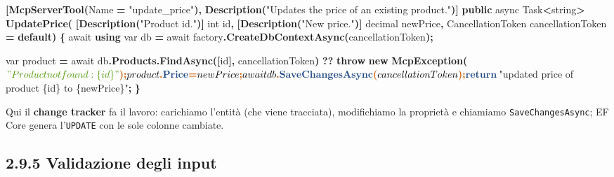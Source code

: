 \documentclass[
  italian,
  10pt,
]{book}
\newenvironment{Shaded}{\begin{snugshade}}{\end{snugshade}}
\newcommand{\DataTypeTok}[1]{\textcolor[rgb]{0.13,0.29,0.53}{#1}}
\newcommand{\FunctionTok}[1]{\textcolor[rgb]{0.13,0.29,0.53}{\textbf{#1}}}
\newcommand{\KeywordTok}[1]{\textcolor[rgb]{0.13,0.29,0.53}{\textbf{#1}}}
\newcommand{\NormalTok}[1]{#1}
\newcommand{\OperatorTok}[1]{\textcolor[rgb]{0.81,0.36,0.00}{\textbf{#1}}}
\newcommand{\StringTok}[1]{\textcolor[rgb]{0.31,0.60,0.02}{#1}}
\begin{document}
\begin{Shaded}
\begin{Highlighting}[]
\OperatorTok{[}\FunctionTok{McpServerTool}\OperatorTok{(}\NormalTok{Name }\OperatorTok{=} \StringTok{"update\_price"}\OperatorTok{),} \FunctionTok{Description}\OperatorTok{(}\StringTok{"Updates the price of an existing product."}\OperatorTok{)]}
\KeywordTok{public}\NormalTok{ async Task}\OperatorTok{\textless{}}\DataTypeTok{string}\OperatorTok{\textgreater{}} \FunctionTok{UpdatePrice}\OperatorTok{(}
    \OperatorTok{[}\FunctionTok{Description}\OperatorTok{(}\StringTok{"Product id."}\OperatorTok{)]} \DataTypeTok{int}\NormalTok{ id}\OperatorTok{,}
    \OperatorTok{[}\FunctionTok{Description}\OperatorTok{(}\StringTok{"New price."}\OperatorTok{)]} \DataTypeTok{decimal}\NormalTok{ newPrice}\OperatorTok{,}
\NormalTok{    CancellationToken cancellationToken }\OperatorTok{=} \KeywordTok{default}\OperatorTok{)}
\OperatorTok{\{}
\NormalTok{    await }\KeywordTok{using} \DataTypeTok{var}\NormalTok{ db }\OperatorTok{=}\NormalTok{ await factory}\OperatorTok{.}\FunctionTok{CreateDbContextAsync}\OperatorTok{(}\NormalTok{cancellationToken}\OperatorTok{);}

    \DataTypeTok{var}\NormalTok{ product }\OperatorTok{=}\NormalTok{ await db}\OperatorTok{.}\FunctionTok{Products}\OperatorTok{.}\FunctionTok{FindAsync}\OperatorTok{([}\NormalTok{id}\OperatorTok{],}\NormalTok{ cancellationToken}\OperatorTok{)}
        \OperatorTok{??} \KeywordTok{throw} \KeywordTok{new} \FunctionTok{McpException}\OperatorTok{(}\NormalTok{$}\StringTok{"Product not found: \{id\}"}\OperatorTok{);}

\NormalTok{    product}\OperatorTok{.}\FunctionTok{Price} \OperatorTok{=}\NormalTok{ newPrice}\OperatorTok{;}
\NormalTok{    await db}\OperatorTok{.}\FunctionTok{SaveChangesAsync}\OperatorTok{(}\NormalTok{cancellationToken}\OperatorTok{);}

    \KeywordTok{return}\NormalTok{ $}\StringTok{"updated price of product \{id\} to \{newPrice\}"}\OperatorTok{;}
\OperatorTok{\}}
\end{Highlighting}
\end{Shaded}

Qui il \textbf{change tracker} fa il lavoro: carichiamo l'entità (che
viene tracciata), modifichiamo la proprietà e chiamiamo
\texttt{SaveChangesAsync}; EF Core genera l'\texttt{UPDATE} con le sole
colonne cambiate.

\subsection{2.9.5 Validazione degli
input}\label{validazione-degli-input}
\end{document}
